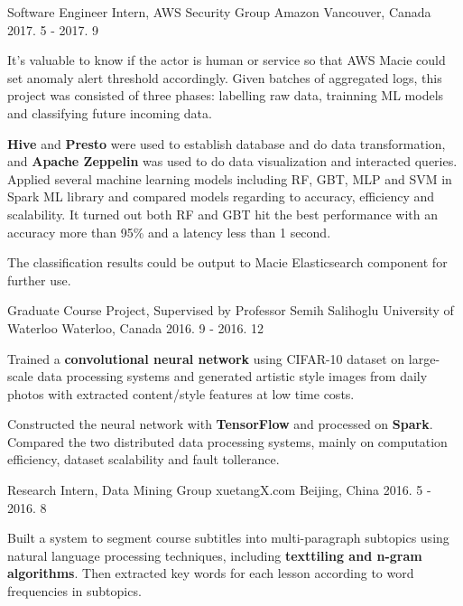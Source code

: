 \begin{cventries}
  \cventry
    {Software Engineer Intern, AWS Security Group}
    {Amazon}
    {Vancouver, Canada}
    {2017. 5 - 2017. 9}
    {
      \begin{cvitems}
        \item{It's valuable to know if the actor is human or service so that AWS Macie could set anomaly alert threshold accordingly. Given batches of aggregated logs, this project was consisted of three phases: labelling raw data, trainning ML models and classifying future incoming data.}
        \item{{\bf Hive} and {\bf Presto} were used to establish database and do data transformation, and {\bf Apache Zeppelin} was used to do data visualization and interacted queries. Applied several machine learning models including RF, GBT, MLP and SVM in Spark ML library and compared models regarding to accuracy, efficiency and scalability. It turned out both RF and GBT hit the best performance with an accuracy more than 95\% and a latency less than 1 second.}
        \item{The classification results could be output to Macie Elasticsearch component for further use.}
      \end{cvitems}
    }
  \cventry
    {Graduate Course Project, Supervised by Professor Semih Salihoglu}
    {University of Waterloo}
    {Waterloo, Canada}
    {2016. 9 - 2016. 12}
    {
      \begin{cvitems}
          \item{
              Trained a {\bf convolutional neural network} using CIFAR-10 dataset on large-scale data processing systems and generated artistic style images from daily photos with extracted content/style features at low time costs.
          }
          \item{
              Constructed the neural network with {\bf TensorFlow} and processed on {\bf Spark}. Compared the two distributed data processing systems, mainly on computation efficiency, dataset scalability and fault tollerance.
          }
      \end{cvitems}
    }
  \cventry
    {Research Intern, Data Mining Group}
    {xuetangX.com}
    {Beijing, China}
    {2016. 5 - 2016. 8}
    {
      \begin{cvitems}
        \item{Built a system to segment course subtitles into multi-paragraph subtopics using natural language processing techniques, including {\bf texttiling and n-gram algorithms}. Then extracted key words for each lesson according to word frequencies in subtopics.}

\end{cvitems}}
\end{cventries}
